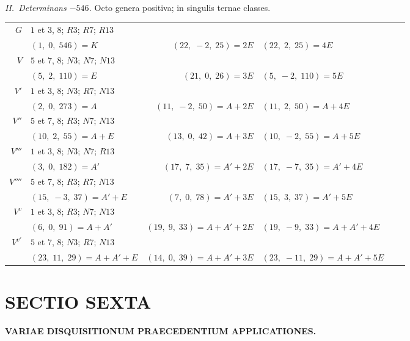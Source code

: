 \documentclass[12pt,a4paper]{article}
\theoremstyle{plain}
\theoremstyle{definition}
\theoremstyle{remark}
\begin{document}
\textit{II.~Determinans $-546$.} Octo genera positiva; in singulis ternae classes.

\begin{center}
\small
\begin{tabular}{r@{\,}l@{\quad}r@{\,}l@{\quad}r@{\,}l}
$G$ & \multicolumn{5}{l}{$1$ et $3$, $8$; $R3$; $R7$; $R13$} \\
& $(1,\;0,\;546) = K$ & $(22,\;-2,\;25) = 2E$ & $(22,\;2,\;25) = 4E$ \\
$V$ & \multicolumn{5}{l}{$5$ et $7$, $8$; $N3$; $N7$; $N13$} \\
& $(5,\;2,\;110) = E$ & $(21,\;0,\;26) = 3E$ & $(5,\;-2,\;110) = 5E$ \\
$V'$ & \multicolumn{5}{l}{$1$ et $3$, $8$; $N3$; $R7$; $N13$} \\
& $(2,\;0,\;273) = A$ & $(11,\;-2,\;50) = A+2E$ & $(11,\;2,\;50) = A+4E$ \\
$V''$ & \multicolumn{5}{l}{$5$ et $7$, $8$; $R3$; $N7$; $N13$} \\
& $(10,\;2,\;55) = A+E$ & $(13,\;0,\;42) = A+3E$ & $(10,\;-2,\;55) = A+5E$ \\
$V'''$ & \multicolumn{5}{l}{$1$ et $3$, $8$; $N3$; $N7$; $R13$} \\
& $(3,\;0,\;182) = A'$ & $(17,\;7,\;35) = A'+2E$ & $(17,\;-7,\;35) = A'+4E$ \\
$V''''$ & \multicolumn{5}{l}{$5$ et $7$, $8$; $R3$; $R7$; $N13$} \\
& $(15,\;-3,\;37) = A'+E$ & $(7,\;0,\;78) = A'+3E$ & $(15,\;3,\;37) = A'+5E$ \\
$V^{v}$ & \multicolumn{5}{l}{$1$ et $3$, $8$; $R3$; $N7$; $N13$} \\
& $(6,\;0,\;91) = A+A'$ & $(19,\;9,\;33) = A+A'+2E$ & $(19,\;-9,\;33) = A+A'+4E$ \\
$V^{v'}$ & \multicolumn{5}{l}{$5$ et $7$, $8$; $N3$; $R7$; $N13$} \\
& $(23,\;11,\;29) = A+A'+E$ & $(14,\;0,\;39) = A+A'+3E$ & $(23,\;-11,\;29) = A+A'+5E$
\end{tabular}
\end{center}

\newpage
\section*{SECTIO SEXTA}
\begin{center}
\textbf{\large VARIAE DISQUISITIONUM PRAECEDENTIUM APPLICATIONES.}
\end{center}
\vspace{0.5em}
\end{document}
